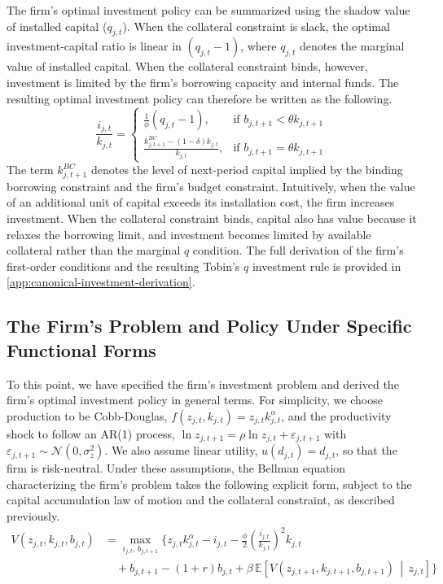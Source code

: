 The firm's optimal investment policy can be summarized using the shadow value of
installed capital ($q_{j,t}$). When the collateral constraint is slack,
the optimal investment-capital ratio is linear in $(q_{j,t}-1)$, where $q_{j,t}$
denotes the marginal value of installed capital. When the collateral constraint
binds, however, investment is limited by the firm's borrowing capacity and internal
funds. The resulting optimal investment policy can therefore be written as the following.
\begin{equation}
\frac{i_{j,t}}{k_{j,t}} =
\begin{cases}
\frac{1}{\phi}(q_{j,t}-1),
& \text{if } b_{j,t+1} < \theta k_{j,t+1} \\
\frac{k_{j,t+1}^{BC} - (1-\delta)k_{j,t}}{k_{j,t}},
& \text{if } b_{j,t+1} = \theta k_{j,t+1}
\end{cases}
\end{equation}
The term $k_{j,t+1}^{BC}$ denotes the level of next-period capital implied by the
binding borrowing constraint and the firm's budget constraint. Intuitively, when
the value of an additional unit of capital exceeds its installation cost, the firm
increases investment. When the collateral
constraint binds, capital also has value because it relaxes the borrowing limit,
and investment becomes limited by available collateral rather than the marginal
$q$ condition. The full derivation of the firm's first-order conditions and the
resulting Tobin's $q$ investment rule is provided in \ref{app:canonical-investment-derivation}.

\subsection{The Firm's Problem and Policy Under Specific Functional Forms} \label{subsec:canonical-investment-specific-forms}

To this point, we have specified the firm's investment problem and derived the firm's optimal investment policy in general terms.
For simplicity, we choose production to be Cobb-Douglas, $f(z_{j,t}, k_{j,t}) = z_{j,t} k_{j,t}^\alpha$, and the productivity shock to follow an AR(1) 
process, $\ln z_{j,t+1} = \rho \ln z_{j,t} + \varepsilon_{j,t+1}$ with $\varepsilon_{j,t+1} \sim \mathcal{N}(0, \sigma_z^2)$. 
We also assume linear utility, $u(d_{j,t}) = d_{j,t}$, so that the firm is risk-neutral.
Under these assumptions, the Bellman equation characterizing the firm's problem takes the following explicit form, 
subject to the capital accumulation law of motion and the collateral constraint, as described previously.
\begin{equation}
\begin{split}
    V(z_{j,t}, k_{j,t}, b_{j,t}) &= 
    \max_{i_{j,t},\, b_{j,t+1}} \Bigg\{ 
    z_{j,t} k_{j,t}^\alpha - i_{j,t} 
    - \frac{\phi}{2} \left(\frac{i_{j,t}}{k_{j,t}}\right)^2 k_{j,t} \\
    &\quad + b_{j,t+1} - (1+r)b_{j,t} 
    + \beta \, \mathbb{E} \left[ 
    V(z_{j,t+1}, k_{j,t+1}, b_{j,t+1}) 
    \,\middle|\, z_{j,t} \right] \Bigg\}
\end{split}
\end{equation}


